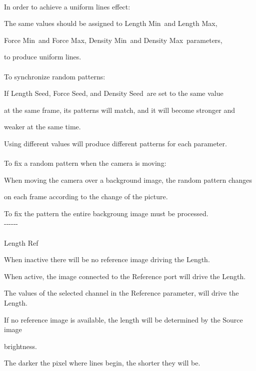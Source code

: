 \documentclass[a4paper,12pt]{article}
\begin{document}
\newpage

\thispagestyle{empty}

\ \vspace{-0.2em}
\\
In order to achieve a uniform lines effect:\par
The same values should be assigned to \textquotedbl Length Min\textquotedbl \ and \textquotedbl Length Max\textquotedbl ,\par
\textquotedbl Force Min\textquotedbl \ and \textquotedbl Force Max\textquotedbl ,
\textquotedbl Density Min\textquotedbl \ and \textquotedbl Density Max\textquotedbl \ parameters,\par 
to produce uniform lines.\\
\\
To synchronize random patterns:\par
If \textquotedbl Length Seed\textquotedbl , \textquotedbl Force Seed\textquotedbl , and \textquotedbl Density Seed\textquotedbl \ are set to the same value\par 
at the same frame, its patterns will match, and it will become stronger and\par 
weaker at the same time.\par
Using different values will produce different patterns for each parameter.\\
\\
To fix a random pattern when the camera is moving:\par
When moving the camera over a background image, the random pattern changes\par 
on each frame according to the change of the picture.\par
To fix the pattern the entire backgroung image must be processed.\\
-{-}-{-}-{-}\\
\\
Length Ref\par
When inactive there will be no reference image driving the Length.\par
When active, the image connected to the Reference port will drive the Length.\par
The values of the selected channel in the Reference parameter, will drive the Length.\par
If no reference image is available, the length will be determined by the Source image\par 
brightness.\par
The darker the pixel where lines begin, the shorter they will be.\par
\end{document}
